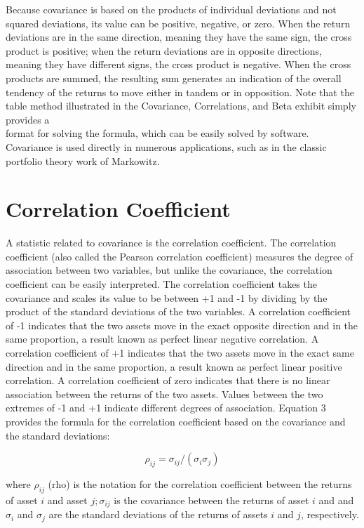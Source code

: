 \documentclass[11pt]{article}
\begin{document}
Because covariance is based on the products of individual deviations and not squared deviations, its value can be positive, negative, or zero. When the return deviations are in the same direction, meaning they have the same sign, the cross product is positive; when the return deviations are in opposite directions, meaning they have different signs, the cross product is negative. When the cross products are summed, the resulting sum generates an indication of the overall tendency of the returns to move either in tandem or in opposition. Note that the table method illustrated in the Covariance, Correlations, and Beta exhibit simply provides a\\
format for solving the formula, which can be easily solved by software. Covariance is used directly in numerous applications, such as in the classic portfolio theory work of Markowitz.

\section*{Correlation Coefficient}
A statistic related to covariance is the correlation coefficient. The correlation coefficient (also called the Pearson correlation coefficient) measures the degree of association between two variables, but unlike the covariance, the correlation coefficient can be easily interpreted. The correlation coefficient takes the covariance and scales its value to be between +1 and -1 by dividing by the product of the standard deviations of the two variables. A correlation coefficient of -1 indicates that the two assets move in the exact opposite direction and in the same proportion, a result known as perfect linear negative correlation. A correlation coefficient of +1 indicates that the two assets move in the exact same direction and in the same proportion, a result known as perfect linear positive correlation. A correlation coefficient of zero indicates that there is no linear association between the returns of the two assets. Values between the two extremes of -1 and +1 indicate different degrees of association. Equation 3 provides the formula for the correlation coefficient based on the covariance and the standard deviations:


\begin{equation*}
\rho_{i j}=\sigma_{i j} /\left(\sigma_{i} \sigma_{j}\right) \tag{3}
\end{equation*}


where $\rho_{i j}$ (rho) is the notation for the correlation coefficient between the returns of asset $i$ and asset $j ; \sigma_{i j}$ is the covariance between the returns of asset $i$ and and $\sigma_{i}$ and $\sigma_{j}$ are the standard deviations of the returns of assets $i$ and $j$, respectively.
\end{document}
